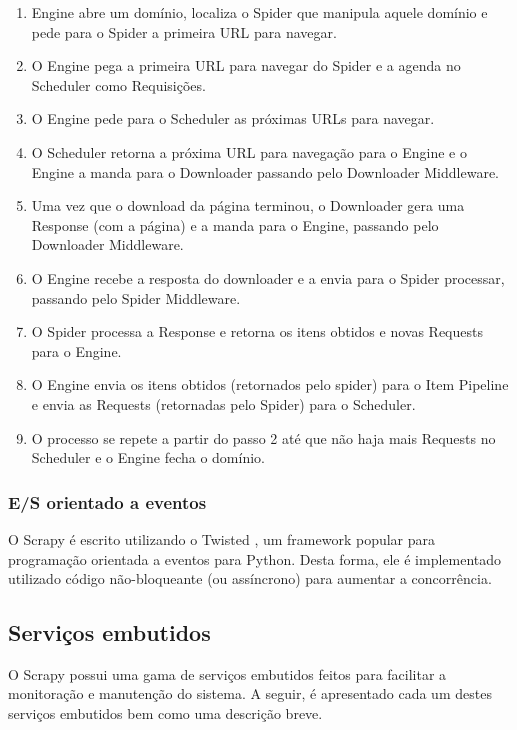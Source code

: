 \begin{enumerate}
	\item Engine abre um domínio, localiza o Spider que manipula aquele domínio e pede para o Spider a primeira URL para navegar.
	\item O Engine pega a primeira URL para navegar do Spider e a agenda no Scheduler como Requisições.
	\item O Engine pede para o Scheduler as próximas URLs para navegar.
	\item O Scheduler retorna a próxima URL para navegação para o Engine e o Engine a manda para o Downloader passando pelo Downloader Middleware.
	\item Uma vez que o download da página terminou, o Downloader gera uma Response (com a página) e a manda para o Engine, passando pelo Downloader Middleware.
	\item O Engine recebe a resposta do downloader e a envia para o Spider processar, passando pelo Spider Middleware.
	\item O Spider processa a Response e retorna os itens obtidos e novas Requests para o Engine.
	\item O Engine envia os itens obtidos (retornados pelo spider) para o Item Pipeline e envia as Requests (retornadas pelo Spider) para o Scheduler.
	\item O processo se repete a partir do passo 2 até que não haja mais Requests no Scheduler e o Engine fecha o domínio.
\end{enumerate}

\subsubsection{E/S orientado a eventos}

O Scrapy é escrito utilizando o Twisted \cite{twisted}, um framework popular para programação orientada a eventos para Python. Desta forma, ele é implementado utilizado código não-bloqueante (ou assíncrono) para aumentar a concorrência.

\subsection{Serviços embutidos}

O Scrapy possui uma gama de serviços embutidos feitos para facilitar a monitoração e manutenção do sistema. A seguir, é apresentado cada um destes serviços embutidos bem como uma descrição breve.

